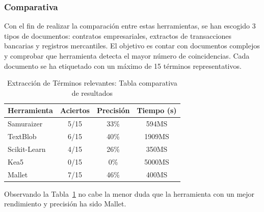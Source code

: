 \documentclass[runningheads,a4paper]{llncs}
\theoremstyle{break}
\newcommand{\rowstyle}[1]{\gdef\currentrowstyle{#1}%
  #1\ignorespaces
}
\begin{document}
\vspace{-1em}
\subsubsection{Comparativa}
\textbf{}

Con el fin de realizar la comparación entre estas herramientas, se han escogido 3 tipos de documentos: contratos empresariales, extractos de transacciones bancarias y registros mercantiles. El objetivo es contar con documentos complejos y comprobar que herramienta detecta el mayor número de coincidencias. Cada documento se ha etiquetado con un máximo de 15 términos representativos.

\bgroup
\setlength{\tabcolsep}{12pt}
\def\arraystretch{1.2}
\begin{table}

\begin{center}
\begin{tabular}{p{4cm}| c| c | c }
\rowstyle{\bfseries} Herramienta & \rowstyle{\bfseries}  Aciertos & \rowstyle{\bfseries} Precisión & \rowstyle{\bfseries} Tiempo (s)\\\hline

Samuraizer        & 5/15    & 33\% & 594MS  \\ %
TextBlob		  & 6/15    & 40\% & 1909MS \\ %
Scikit-Learn	  & 4/15    & 26\% & 350MS  \\%
Kea5              & 0/15    & 0\%  & 5000MS \\ %
Mallet			  & 7/15    & 46\% & 400MS \\ \hline %
\end{tabular}
\end{center}
\vspace{1em}
\caption{Extracción de Términos relevantes: Tabla comparativa de resultados \label{tab:keywords}}
\end{table}
\egroup
\vspace{-1.5em}

Observando la Tabla~\ref{tab:keywords} no cabe la menor duda que la herramienta con un mejor rendimiento y precisión ha sido Mallet.

\end{document}
